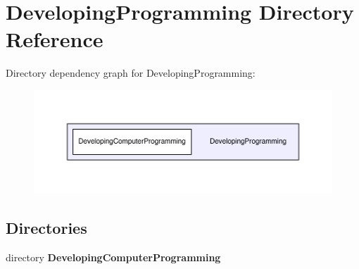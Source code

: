\section{Developing\+Programming Directory Reference}
\label{dir_c87bf93402deaf9053be107725f38686}
Directory dependency graph for Developing\+Programming\+:
\nopagebreak
\begin{figure}[H]
\begin{center}
\leavevmode
\includegraphics[width=350pt]{dir_c87bf93402deaf9053be107725f38686_dep}
\end{center}
\end{figure}
\subsection*{Directories}
\begin{DoxyCompactItemize}
\item 
directory {\bf Developing\+Computer\+Programming}
\end{DoxyCompactItemize}
